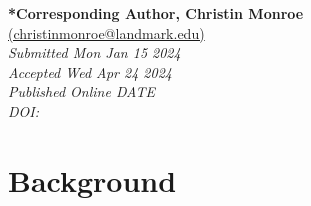 \documentclass[11.5pt]{sig-alternate}
\begin{document}



\textbf{*Corresponding Author, Christin Monroe}\\
\href{mailto:christinmonroe@landmark.edu}{(christinmonroe@landmark.edu)} \\
\textit{Submitted Mon Jan 15 2024}\\
\textit{Accepted Wed Apr 24 2024} \\
\textit{Published Online DATE} \\
\textit{DOI: } \\

\pagebreak
\pagebreak

\vspace{5mm}
\section*{\vspace{140mm}}
\section*{Background}
\end{document}
